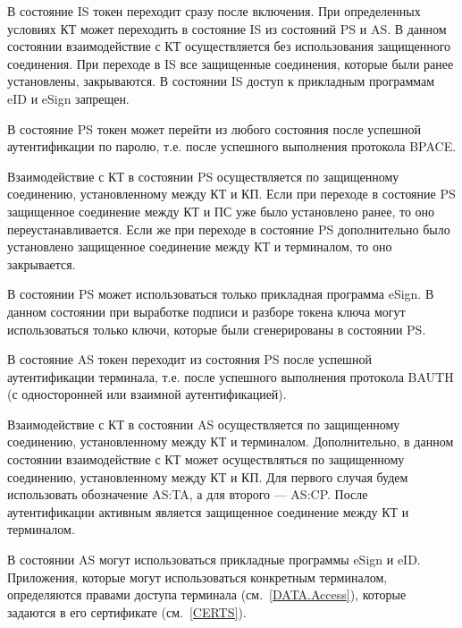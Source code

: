 В состояние IS токен переходит сразу после включения.
При определенных условиях КТ может переходить в состояние
IS из состояний PS и AS.
В данном состоянии взаимодействие с КТ осуществляется без использования 
защищенного соединения. При переходе в IS все защищенные соединения, 
которые были ранее установлены, закрываются.
В состоянии IS доступ к прикладным программам eID и eSign запрещен.

В состояние PS токен может перейти из любого состояния 
после успешной аутентификации по паролю, 
т.е. после успешного выполнения протокола BPACE. 
%

Взаимодействие с КТ в состоянии PS осуществляется по 
защищенному соединению, установленному между КТ и КП. 
Если при переходе в состояние PS защищенное соединение между КТ и ПС уже было 
установлено ранее, то оно переустанавливается. 
Если же при переходе в состояние PS дополнительно было установлено 
защищенное соединение между КТ и терминалом, то оно закрывается.

В состоянии PS может использоваться только прикладная программа eSign.
В данном состоянии при выработке подписи и разборе токена ключа
могут использоваться только ключи, которые были 
сгенерированы в состоянии PS.

В состояние AS токен переходит из состояния PS 
после успешной аутентификации терминала, т.е. 
после успешного выполнения протокола BAUTH 
(с односторонней или взаимной аутентификацией). 

Взаимодействие с КТ в состоянии AS осуществляется по 
защищенному соединению, установленному между КТ и терминалом.
Дополнительно, в данном состоянии 
взаимодействие с КТ может осуществляться 
по защищенному соединению, установленному между КТ и КП.
Для первого случая будем использовать обозначение AS:TA, 
а для второго --- AS:CP. 
После аутентификации активным является защищенное 
соединение между КТ и терминалом.


В состоянии AS могут использоваться прикладные программы eSign и eID. 
Приложения, которые могут использоваться конкретным терминалом,
определяются правами доступа терминала (см.~\ref{DATA.Access}),
которые задаются в его сертификате (см.~\ref{CERTS}).
